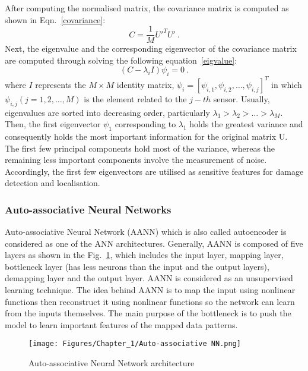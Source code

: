 After computing the normalised matrix, the covariance matrix is computed as shown in Eqn.~\ref{covariance}:
\begin{equation}
	C = \frac{1}{M}U'^TU' \ .
	\label{covariance}
\end{equation}
Next, the eigenvalue and the corresponding eigenvector of the covariance matrix are computed through solving the following equation~\ref{eigvalue}:
\begin{equation}
	(C-\lambda_iI)\psi_i =0 \ .
	\label{eigvalue}
\end{equation}
where \(I\) represents the \(M\times M\) identity matrix, \(\psi_i = [\psi_{i,1},\psi_{i,2}, \hdots, \psi_{i,j}]^T\) in which \(\psi_{i,j}(j=1, 2, \hdots, M)\) is the element related to the \(j-th\) sensor.
Usually, eigenvalues are sorted into decreasing order, particularly \(\lambda_1>\lambda_2>\hdots>\lambda_M\). 
Then, the first eigenvector \(\psi_1\) corresponding to \(\lambda_1\) holds the greatest variance and consequently holds the most important information for the original matrix U. 
The first few principal components hold most of the variance, whereas the remaining less important components involve the measurement of noise.
Accordingly, the first few eigenvectors are utilised as sensitive features for damage detection and localisation.
\subsubsection{Auto-associative Neural Networks}
Auto-associative Neural Network (AANN) which is also called autoencoder is considered as one of the ANN architectures. 
Generally, AANN is composed of five layers as shown in the Fig.~\ref{fig:AANN}, which includes the input layer, mapping layer, bottleneck layer (has less neurons than the input and the output layers), demapping layer and the output layer. 
AANN is considered as an unsupervised learning technique. 
The idea behind AANN is to map the input using nonlinear functions then reconstruct it using nonlinear functions so the network can learn from the inputs themselves.
The main purpose of the bottleneck is to push the model to learn important features of the mapped data patterns.
\begin{figure}[!ht]
	\begin{center}
		\centering
		\texttt{[image: Figures/Chapter\_1/Auto-associative NN.png]}
	\end{center}
	\caption{Auto-associative Neural Network architecture} 
	\label{fig:AANN}
\end{figure}
